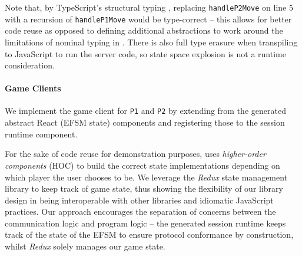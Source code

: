 Note that, by TypeScript's structural typing \cite{TypeScriptSpec}, replacing
\texttt{handleP2Move} on line 5 with a recursion of \texttt{handleP1Move} would be
type-correct -- this allows for better code reuse as opposed to defining
additional abstractions to work around the limitations of nominal typing in
\cite{Hybrid2016}.
There is also full type erasure when transpiling to JavaScript to run the
server code, so state space explosion is not a runtime consideration.

\paragraph{Game Clients}
We implement the game client for \texttt{P1} and
\texttt{P2} by extending from the generated abstract React (EFSM state)
components and registering those to the session runtime component.

For the sake of code reuse for demonstration purposes, \cite{NoughtsAndCrosses}
uses \textit{higher-order components} (HOC) to build the correct state
implementations depending on which player the user chooses to be.
We leverage the \textit{Redux} \cite{Redux} state management library to keep track of game
state, thus showing the flexibility of our library design in being
interoperable with other libraries and idiomatic JavaScript practices.
Our approach encourages the separation of concerns between the 
communication logic and program logic -- the generated session runtime
keeps track of the state of the EFSM to ensure protocol conformance by 
construction, whilst \textit{Redux} solely manages our game state.
